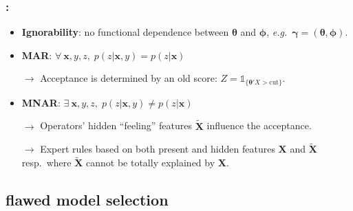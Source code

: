 \documentclass[english,xcolor={rgb,dvipsnames,table,usenames}]{beamer}
\begin{document}
\begin{frame}
\frametitle{\secname : \subsecname}

\begin{itemize}
\item \textbf{Ignorability}: no functional dependence between $\bm{\theta}$ and $\bm{\phi}$, \textit{e.g.}\ $\bm{\gamma} = (\bm{\theta},\bm{\phi})$.

\item<2-> \textbf{MAR}: $\forall \: \bm{x},y,z, \; p(z| \bm{x},y) = p(z| \bm{x})$

$\rightarrow$ Acceptance is determined by an old score: $Z = \mathds{1}_{\{\bm{\theta}'X > \text{cut}\}}$.

\item<3-> \textbf{MNAR}: $\exists \: \bm{x},y,z, \; p(z| \bm{x},y) \neq p(z| \bm{x})$

$\rightarrow$ Operators' hidden ``feeling'' features $\tilde{\bm{X}}$ influence the acceptance.

$\rightarrow$ Expert rules based on both present and hidden features $\bm{X}$ and $\tilde{\bm{X}}$ resp.\ where $\tilde{\bm{X}}$ cannot be totally explained by $\bm{X}$.
\end{itemize}

\end{frame}



\subsection{flawed model selection}
\end{document}

